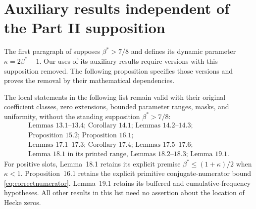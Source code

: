\section{Auxiliary results independent of the Part II supposition}\label{app:partii}
The first paragraph of  supposes $\beta^*>7/8$ and defines its dynamic parameter $\kappa=2\beta^*-1$. Our uses of its auxiliary results require versions with this supposition removed. The following proposition specifies those versions and proves the removal by their mathematical dependencies.

\begin{proposition}\label{prop:partii}
The local statements in the following list remain valid with their original coefficient classes, zero extensions, bounded parameter ranges, masks, and uniformity, without the standing supposition $\beta^*>7/8$:
\[
\begin{gathered}
 \text{Lemmas 13.1--13.4; Corollary 14.1; Lemmas 14.2--14.3;}\\
 \text{Proposition 15.2; Proposition 16.1;}\\
 \text{Lemmas 17.1--17.3; Corollary 17.4; Lemmas 17.5--17.6;}\\
 \text{Lemma 18.1 in its printed range, Lemmas 18.2--18.3; Lemma 19.1.}
\end{gathered}
\]
For positive slots, Lemma~18.1 retains its explicit premise $\beta^*\le(1+\kappa)/2$ when $\kappa<1$. Proposition~16.1 retains the explicit primitive conjugate-numerator bound \eqref{eq:correctnumerator}. Lemma~19.1 retains its buffered and cumulative-frequency hypotheses. All other results in this list need no assertion about the location of Hecke zeros.
\end{proposition}
